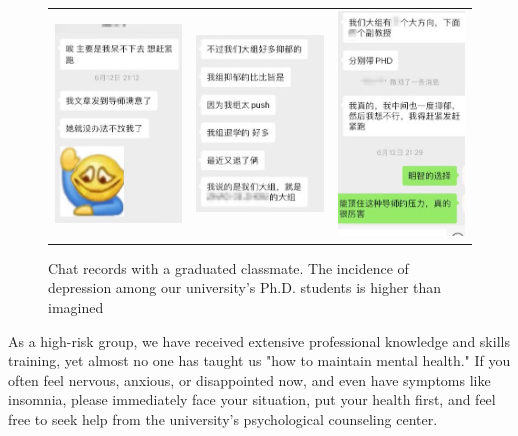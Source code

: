\begin{figure}[H]
    \begin{tabular}{rcl}
        \includegraphics[width=0.31\columnwidth]{author-folder/Kai.Wu/chat1of3.jpg} &
        \includegraphics[width=0.31\columnwidth]{author-folder/Kai.Wu/chat2of3.jpg} &
        \includegraphics[width=0.31\columnwidth]{author-folder/Kai.Wu/chat3of3.jpg}
    \end{tabular}
    \caption{Chat records with a graduated classmate. The incidence of depression among our university's Ph.D. students is higher than imagined}
\end{figure}

As a high-risk group, we have received extensive professional knowledge and skills training, yet almost no one has taught us "how to maintain mental health." If you often feel nervous, anxious, or disappointed now, and even have symptoms like insomnia, please immediately face your situation, put your health first, and feel free to seek help from the university's psychological counseling center.

